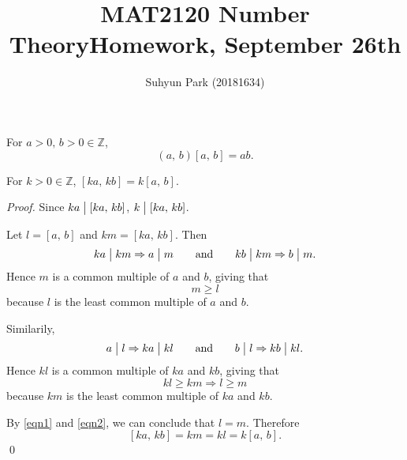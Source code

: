 



\title{MAT2120 Number Theory\newline Homework, September 26th}
\author{Suhyun Park (20181634)}

\maketitle

\begin{theorem}
    For $a>0,\,b>0\in\mathbb{Z}$,
    \[
        \left(a,\,b\right)\left[a,\,b\right] = ab.    
    \]
\end{theorem}

\begin{lemma}\label{lemma1}
    For $k > 0 \in \mathbb{Z}$, $\left[ka,\,kb\right] = k\left[a,\,b\right]$.
\end{lemma}
\begin{proof}
    Since $ka \bigm| \left[ka,\,kb\right]$, $k \bigm| \left[ka,\,kb\right]$.

    Let $l = \left[a,\,b\right]$ and $km = \left[ka,\,kb\right]$.
    Then
    \[
        ka \bigm| km \Rightarrow a \bigm| m \qquad \mbox{and} \qquad
        kb \bigm| km \Rightarrow b \bigm| m.
    \]
    Hence $m$ is a common multiple of $a$ and $b$, giving that
    \begin{equation}
        m \geq l \label{eqn1}
    \end{equation}
    because $l$ is the least common multiple of $a$ and $b$.

    Similarily, 
    \[
        a \bigm| l \Rightarrow ka \bigm| kl \qquad \mbox{and} \qquad
        b \bigm| l \Rightarrow kb \bigm| kl.
    \]
    Hence $kl$ is a common multiple of $ka$ and $kb$, giving that
    \begin{equation}
        kl \geq km \Rightarrow l \geq m \label{eqn2}
    \end{equation}
    because $km$ is the least common multiple of $ka$ and $kb$.

    By \eqref{eqn1} and \eqref{eqn2}, we can conclude that $l=m$. Therefore
    \[
        \left[ka,\,kb\right] = km = kl = k\left[a,\,b\right].
    \]
    \qed
\end{proof}

